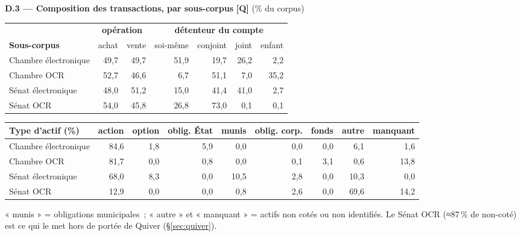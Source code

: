 \documentclass[11pt,a4paper]{article}
\begin{document}
\textbf{D.3 — Composition des transactions, par sous-corpus} \hfill {\footnotesize\textbf{[Q]} (\% du corpus)}
\begin{center}\small
\begin{tabular}{l rr @{\hspace{1.4em}} rrrr}
\toprule
& \multicolumn{2}{c}{\bfseries opération} & \multicolumn{4}{c}{\bfseries détenteur du compte}\\
\cmidrule(lr){2-3}\cmidrule(lr){4-7}
\bfseries Sous-corpus & achat & vente & soi-même & conjoint & joint & enfant\\
\midrule
Chambre électronique & 49,7 & 49,7 & 51,9 & 19,7 & 26,2 & 2,2 \\
Chambre OCR & 52,7 & 46,6 & 6,7 & 51,1 & 7,0 & 35,2 \\
Sénat électronique & 48,0 & 51,2 & 15,0 & 41,4 & 41,0 & 2,7 \\
Sénat OCR & 54,0 & 45,8 & 26,8 & 73,0 & 0,1 & 0,1 \\
\bottomrule
\end{tabular}
\end{center}
\begin{center}\small
\begin{tabular}{l rrrrrrrr}
\toprule
\bfseries Type d'actif (\%) & action & option & oblig. État & munis & oblig. corp. & fonds & autre & manquant\\
\midrule
Chambre électronique & 84,6 & 1,8 & 5,9 & 0,0 & 0,0 & 0,0 & 6,1 & 1,6 \\
Chambre OCR & 81,7 & 0,0 & 0,8 & 0,0 & 0,1 & 3,1 & 0,6 & 13,8 \\
Sénat électronique & 68,0 & 8,3 & 0,0 & 10,5 & 2,8 & 0,0 & 10,3 & 0,0 \\
Sénat OCR & 12,9 & 0,0 & 0,0 & 0,8 & 2,6 & 0,0 & 69,6 & 14,2 \\
\bottomrule
\end{tabular}
\end{center}
{\footnotesize « munis » = obligations municipales~; « autre » et « manquant » = actifs non cotés ou non
identifiés. Le Sénat OCR (≈87\,\% de non-coté) est ce qui le met hors de portée de Quiver (§\ref{sec:quiver}).}
\end{document}
